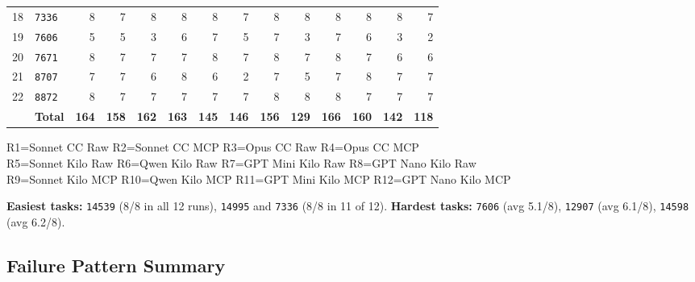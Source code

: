 \begin{table}[h]
\begin{tabular}{clrrrrrrrrrrrr}
18 & \texttt{7336}   &  8 &  7 &  8 &  8 &  8 &  7 &  8 &  8 &  8 &  8 &  8 &  7 \\
19 & \texttt{7606}   &  5 &  5 &  3 &  6 &  7 &  5 &  7 &  3 &  7 &  6 &  3 &  2 \\
20 & \texttt{7671}   &  8 &  7 &  7 &  7 &  8 &  7 &  8 &  7 &  8 &  7 &  6 &  6 \\
21 & \texttt{8707}   &  7 &  7 &  6 &  8 &  6 &  2 &  7 &  5 &  7 &  8 &  7 &  7 \\
22 & \texttt{8872}   &  8 &  7 &  7 &  7 &  7 &  7 &  8 &  8 &  8 &  7 &  7 &  7 \\
\midrule
   & \textbf{Total}
   & \textbf{164} & \textbf{158} & \textbf{162} & \textbf{163}
   & \textbf{145} & \textbf{146} & \textbf{156} & \textbf{129}
   & \textbf{166} & \textbf{160} & \textbf{142} & \textbf{118} \\
\bottomrule
\end{tabular}

\medskip
\footnotesize
R1=Sonnet CC Raw \quad R2=Sonnet CC MCP \quad R3=Opus CC Raw \quad R4=Opus CC MCP \\
R5=Sonnet Kilo Raw \quad R6=Qwen Kilo Raw \quad R7=GPT Mini Kilo Raw \quad R8=GPT Nano Kilo Raw \\
R9=Sonnet Kilo MCP \quad R10=Qwen Kilo MCP \quad R11=GPT Mini Kilo MCP \quad R12=GPT Nano Kilo MCP
\end{table}

\noindent
\textbf{Easiest tasks:} \texttt{14539} (8/8 in all 12 runs), \texttt{14995} and \texttt{7336}
(8/8 in 11 of 12).
\textbf{Hardest tasks:} \texttt{7606} (avg 5.1/8), \texttt{12907} (avg 6.1/8),
\texttt{14598} (avg 6.2/8).

\subsection{Failure Pattern Summary}

